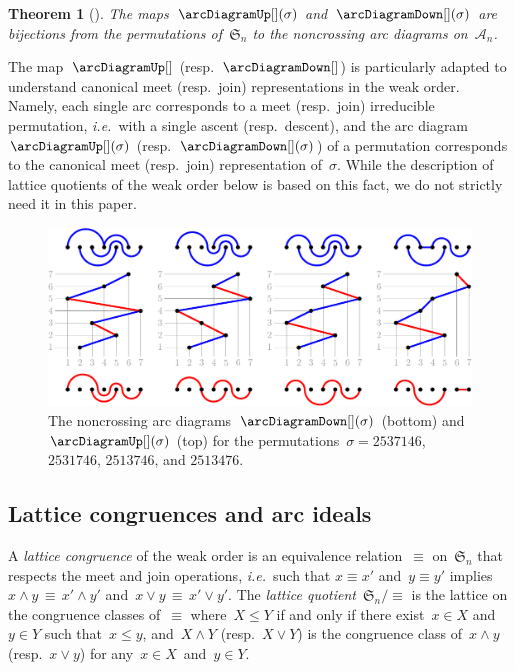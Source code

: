 \documentclass{amsart}
\newtheorem{theorem}{Theorem}[section]
\theoremstyle{definition}
\newcommand{\f}[1]{{\mathfrak{#1}}} %
\newcommand{\ie}{\textit{i.e.}~} %
\newcommand{\darkblue}{\color{darkblue}} %
\newcommand{\defn}[1]{\textsl{\darkblue #1}} %
\newcommand{\arcs}{{\mathcal{A}}} %
\newcommand{\meet}{\wedge} %
\newcommand{\join}{\vee} %
\begin{document}
\begin{theorem}[\cite{Reading-arcDiagrams}]
The maps~$\arcDiagramUp[](\sigma)$ and~$\arcDiagramDown[](\sigma)$ are bijections from the permutations of~$\f{S}_n$ to the noncrossing arc diagrams on~$\arcs_n$.
\end{theorem}

The map~$\arcDiagramUp[]$ (resp.~$\arcDiagramDown[]$) is particularly adapted to understand canonical meet (resp.~join) representations in the weak order.
Namely, each single arc corresponds to a meet (resp.~join) irreducible permutation, \ie with a single ascent (resp.~descent), and the arc diagram~$\arcDiagramUp[](\sigma)$ (resp.~$\arcDiagramDown[](\sigma)$) of a permutation corresponds to the canonical meet (resp.~join) representation of~$\sigma$.
While the description of lattice quotients of the weak order below is based on this fact, we do not strictly need it in this paper.

\begin{figure}
	\capstart
	\centerline{\includegraphics[scale=.85]{arcDiagrams}}
	\caption{The noncrossing arc diagrams~$\arcDiagramDown[](\sigma)$ (bottom) and~$\arcDiagramUp[](\sigma)$ (top) for the permutations~$\sigma = 2537146$, $2531746$, $2513746$, and $2513476$. \cite[Fig.~2]{Pilaud-arcDiagramAlgebra}}
	\label{fig:noncrossingArcDiagrams}
\end{figure}


\subsection{Lattice congruences and arc ideals}
\label{subsec:latticeCongruencesArcIdeals}

A \defn{lattice congruence} of the weak order is an equivalence relation~$\equiv$ on~$\f{S}_n$ that respects the meet and join operations, \ie such that $x \equiv x'$ and~$y \equiv y'$ implies $x \meet y \, \equiv \, x' \meet y'$ and~$x \join y \, \equiv \, x' \join y'$.
The \defn{lattice quotient}~$\f{S}_n/{\equiv}$ is the lattice on the congruence classes of~$\equiv$ where~$X \le Y$ if and only if there exist~$x \in X$ and~$y \in Y$ such that~$x \le y$, and~$X \meet Y$ (resp.~$X \join Y$) is the congruence class of~$x \meet y$ (resp.~$x \join y$) for any~$x \in X$~and~$y \in Y$.
\end{document}

